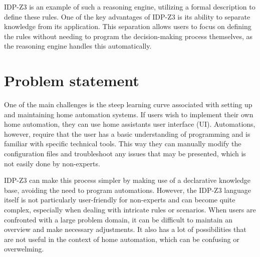 \documentclass[11pt,a4paper]{report}
\begin{document}
IDP-Z3 is an example of such a reasoning engine, utilizing a formal description to define these rules. One of the key advantages of IDP-Z3 is its ability to separate knowledge from its application. This separation allows users to focus on defining the rules without needing to program the decision-making process themselves, as the reasoning engine handles this automatically.

\section{Problem statement}
One of the main challenges is the steep learning curve associated with setting up and maintaining home automation systems. If users wish to implement their own home automation, they can use home assistants user interface (UI). Automations, however, require that the user has a basic understanding of programming and is familiar with specific technical tools. This way they can manually modify the configuration files and troubleshoot any issues that may be presented, which is not easily done by non-experts.

IDP-Z3 can make this process simpler by making use of a declarative knowledge base, avoiding the need to program automations. However, the IDP-Z3 language itself is not particularly user-friendly for non-experts and can become quite complex, especially when dealing with intricate rules or scenarios. When users are confronted with a large problem domain, it can be difficult to maintain an overview and make necessary adjustments. It also has a lot of possibilities that are not useful in the context of home automation, which can be confusing or overwelming.
\end{document}
